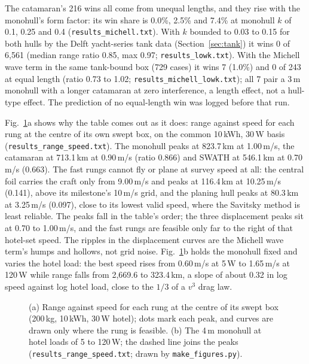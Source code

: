 \documentclass[conference]{IEEEtran}
\begin{document}
The catamaran's 216 wins all come from unequal lengths, and they rise with the monohull's form factor: its win
share is 0.0\%, 2.5\% and 7.4\% at monohull $k$ of 0.1, 0.25 and 0.4
(\texttt{results\_michell.txt}). With $k$ bounded to 0.03 to 0.15 for both hulls by the Delft
yacht-series tank data (Section~\ref{sec:tank}) it wins 0 of 6{,}561 (median range ratio 0.85,
max 0.97; \texttt{results\_lowk.txt}). With the Michell wave term in the same tank-bound box
(729 cases) it wins 7 (1.0\%) and 0 of 243 at equal length (ratio 0.73 to 1.02;
\texttt{results\_michell\_lowk.txt}); all 7 pair a 3\,m monohull with a longer catamaran at zero
interference, a length effect, not a hull-type effect. The prediction of no equal-length win was
logged before that run.

Fig.~\ref{fig:rangespeed}a shows why the table comes out as it does: range against speed for each
rung at the centre of its own swept box, on the common 10\,kWh, 30\,W basis
(\texttt{results\_range\_speed.txt}). The monohull peaks at 823.7\,km at 1.00\,m/s, the catamaran at
713.1\,km at 0.90\,m/s (ratio 0.866) and SWATH at 546.1\,km at 0.70\,m/s (0.663). The fast rungs
cannot fly or plane at survey speed at all: the central foil carries the craft only from 9.00\,m/s
and peaks at 116.4\,km at 10.25\,m/s (0.141), above its milestone's 10\,m/s grid, and the planing
hull peaks at 80.3\,km at 3.25\,m/s (0.097), close to its lowest valid speed, where the Savitsky
method is least reliable. The peaks fall in the table's order; the three displacement peaks sit at 0.70 to 1.00\,m/s, and the
fast rungs are feasible only far to the right of that hotel-set speed. The ripples in the
displacement curves are the Michell wave term's humps and hollows, not grid noise.
Fig.~\ref{fig:rangespeed}b holds the monohull fixed and varies the hotel load: the best speed
rises from 0.60\,m/s at 5\,W to 1.65\,m/s at 120\,W while range falls from 2{,}669.6 to 323.4\,km,
a slope of about 0.32 in log speed against log hotel load, close to the $1/3$ of a $v^3$ drag law.

\begin{figure}[t]
\centering
\resizebox{\columnwidth}{!}{}
\caption{(a) Range against speed for each rung at the centre of its swept box (200\,kg, 10\,kWh,
30\,W hotel); dots mark each peak, and curves are drawn only where the rung is feasible.
(b) The 4\,m monohull at hotel loads of 5 to 120\,W; the dashed line joins the peaks
(\texttt{results\_range\_speed.txt}; drawn by \texttt{make\_figures.py}).}
\label{fig:rangespeed}
\end{figure}
\end{document}
